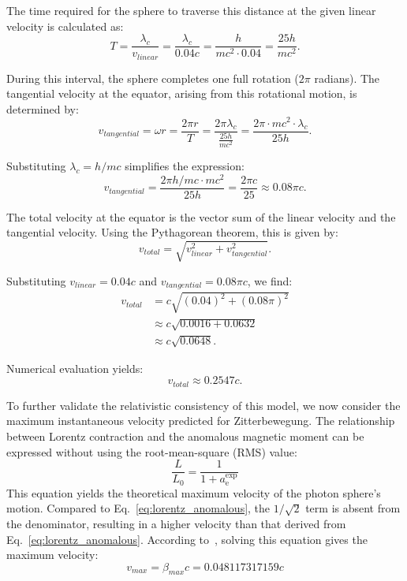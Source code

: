 \documentclass[%
 reprint,
 amsmath,amssymb,
 aps,
]{revtex4-1}
\numberwithin{equation}{section}%
\begin{document}
The time required for the sphere to traverse this distance at the given linear velocity is calculated as:
\begin{equation}
\label{eq:transit_time_corrected}
T = \frac{\lambda_c}{v_{linear}} = \frac{\lambda_c}{0.04c} = \frac{h}{mc^2 \cdot 0.04} = \frac{25h}{mc^2}.
\end{equation}

During this interval, the sphere completes one full rotation ($2\pi$ radians). The tangential velocity at the equator, arising from this rotational motion, is determined by:
\begin{equation}
\label{eq:tangential_velocity_corrected}
v_{tangential} = \omega r = \frac{2\pi r}{T} = \frac{2\pi \lambda_c}{\frac{25h}{mc^2}} = \frac{2\pi \cdot mc^2 \cdot \lambda_c}{25h}.
\end{equation}

Substituting $\lambda_c = h/mc$ simplifies the expression:
\begin{equation}
v_{tangential} = \frac{2\pi h/mc \cdot mc^2}{25h} = \frac{2\pi c}{25} \approx 0.08\pi c.
\end{equation}

The total velocity at the equator is the vector sum of the linear velocity and the tangential velocity. Using the Pythagorean theorem, this is given by:
\begin{equation}
\label{eq:total_velocity_corrected}
v_{total} = \sqrt{v_{linear}^2 + v_{tangential}^2}.
\end{equation}

Substituting $v_{linear} = 0.04c$ and $v_{tangential} = 0.08\pi c$, we find:
\begin{equation}
\begin{aligned}
v_{total} &= c\sqrt{(0.04)^2 + (0.08\pi)^2} \\ &
\approx c\sqrt{0.0016 + 0.0632} \\ &
\approx c\sqrt{0.0648}.
\end{aligned}
\end{equation}

Numerical evaluation yields:
\begin{equation}
v_{total} \approx 0.2547c.
\end{equation}

To further validate the relativistic consistency of this model, we now consider the maximum instantaneous velocity predicted for Zitterbewegung. The relationship between Lorentz contraction and the anomalous magnetic moment can be expressed without using the root-mean-square (RMS) value:
\begin{equation}
\label{eq:lorentz_direct}
\frac{L}{L_0} = \frac{1}{1 + a^{\text{exp}}_{\text{e}}}
\end{equation}
This equation yields the theoretical maximum velocity of the photon sphere's motion. Compared to Eq.~\ref{eq:lorentz_anomalous}, the $1/\sqrt{2}$ term is absent from the denominator, resulting in a higher velocity than that derived from Eq.~\ref{eq:lorentz_anomalous}. According to~\cite{Hanamura2023}, solving this equation gives the maximum velocity:
\begin{equation}
\label{eq:max_velocity}
v_{max} = \beta_{max}c = 0.048117317159c
\end{equation}
\end{document}
